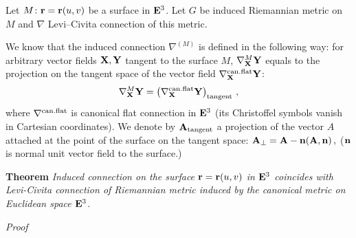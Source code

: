 \documentclass[12pt]{article}
\theoremstyle{theorem}
\numberwithin{equation}{section}
\begin{document}
{Let $M\colon {\bf r}={\bf r}(u,v)$ be a surface in ${\bf E}^3$. Let  $G$ be induced Riemannian metric on $M$
and $\nabla$ Levi--Civita connection of this metric.

We know that the induced connection $\nabla^{(M)}$ is defined
    in the following way: for arbitrary vector fields  ${\bf X},{\bf Y}$ tangent to the surface $M$,
    $\nabla^{M}_{\bf X}{\bf Y}$ equals to the projection on the tangent space of the vector field $\nabla^{{\rm can.flat}}_{\bf X}{\bf Y}$:
                   $$
                   \nabla^{M}_{\bf X}{\bf Y} =
                   \left(\nabla^{\rm can.flat}_{\bf X}{\bf Y}\right)_{\rm tangent}\,,
                   $$
where  $\nabla^{\rm can.flat}$ is canonical flat connection
   in ${\bf E}^3$ (its Christoffel symbols
   vanish in Cartesian coordinates).
   We denote by ${\bf A}_{\rm tangent}$ a projection of the vector $A$ attached at the point of the surface on the
tangent space:
             $
          {\bf A}_{\perp}={\bf A}-{\bf n}({\bf A},{\bf n})\,,
             $
(${\bf n}$ is normal unit vector field to the surface.)

\m


{\bf Theorem}    {\it Induced connection on the surface ${\bf r}={\bf r}(u,v)$ in ${\bf E}^3$ coincides with
  Levi-Civita connection of Riemannian metric induced by the canonical metric on Euclidean space ${\bf E}^3$.}

\m

{\sl Proof}

}
\end{document}
